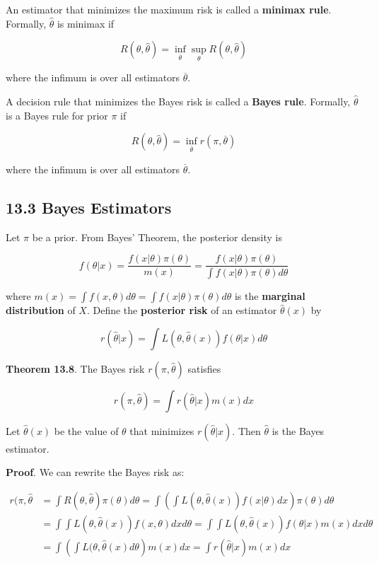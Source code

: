 An estimator that minimizes the maximum risk is called a \textbf{minimax
rule}. Formally, \(\hat{\theta}\) is minimax if

\[R(\theta, \hat{\theta}) = \inf_{\overline{\theta}} \sup_\theta R(\theta, \hat{\theta})\]

where the infimum is over all estimators \(\overline{\theta}\).

A decision rule that minimizes the Bayes risk is called a \textbf{Bayes
rule}. Formally, \(\hat{\theta}\) is a Bayes rule for prior \(\pi\) if

\[R(\theta, \hat{\theta}) = \inf_{\overline{\theta}} r(\pi, \overline{\theta})\]

where the infimum is over all estimators \(\overline{\theta}\).

\subsection*{13.3 Bayes Estimators}\label{bayes-estimators}

Let \(\pi\) be a prior. From Bayes' Theorem, the posterior density is

\[f(\theta | x) = \frac{f(x | \theta) \pi(\theta)}{m(x)} = \frac{f(x | \theta) \pi(\theta)}{\int f(x | \theta) \pi(\theta) d\theta} \]

where
\(m(x) = \int f(x, \theta) d\theta = \int f(x | \theta) \pi(\theta) d\theta\)
is the \textbf{marginal distribution} of \(X\). Define the
\textbf{posterior risk} of an estimator \(\hat{\theta}(x)\) by

\[r(\hat{\theta} | x) = \int L(\theta, \hat{\theta}(x)) f(\theta | x) d\theta\]

\textbf{Theorem 13.8}. The Bayes risk \(r(\pi, \hat{\theta})\) satisfies

\[r(\pi, \hat{\theta}) = \int r(\hat{\theta} | x) m(x) dx\]

Let \(\hat{\theta}(x)\) be the value of \(\theta\) that minimizes
\(r(\hat{\theta} | x)\). Then \(\hat{\theta}\) is the Bayes estimator.

\textbf{Proof}. We can rewrite the Bayes risk as:

\begin{align*}
r(\pi, \hat{\theta} &= \int R(\theta, \hat{\theta}) \pi(\theta) d\theta = \int \left( \int L(\theta, \hat{\theta}(x)) f(x | \theta) dx \right) \pi(\theta) d\theta \\
&= \int \int L(\theta, \hat{\theta}(x)) f(x, \theta) dx d\theta = \int \int L(\theta, \hat{\theta}(x)) f(\theta | x) m(x) dx d\theta \\
&= \int \left(\int L(\theta, \hat{\theta}(x) d\theta \right) m(x) dx = \int r(\hat{\theta} | x) m(x) dx
\end{align*}


